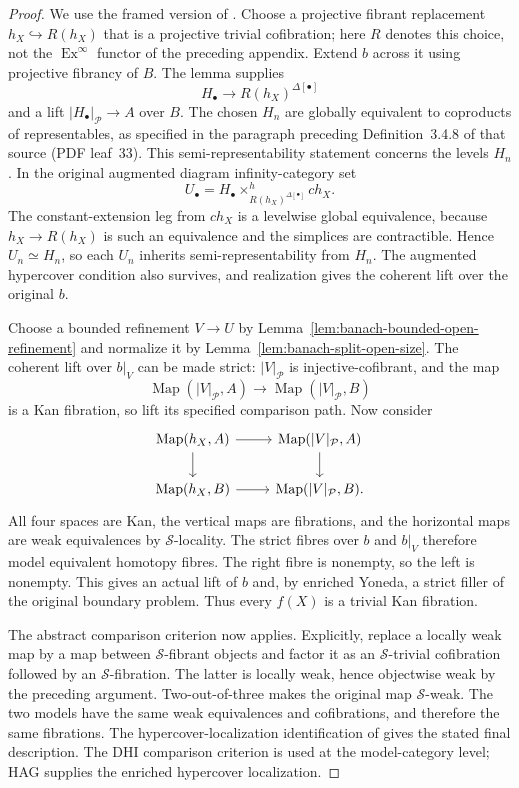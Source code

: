 \documentclass[12pt]{amsart}
\theoremstyle{definition}
\theoremstyle{remark}
\numberwithin{equation}{section}
\DeclareMathOperator{\Map}{Map}
\DeclareMathOperator{\Ex}{Ex}
\begin{document}
\begin{proof}
We use the framed version of
\cite[Lemma~3.4.3, PDF leaves~29--32]{HAGI2005}.
Choose a projective fibrant replacement
$h_X\hookrightarrow R(h_X)$ that is a projective
trivial cofibration; here $R$ denotes this choice,
not the $\Ex^\infty$ functor of the preceding appendix.
Extend $b$ across it using projective fibrancy of $B$.
The lemma supplies
\[
 H_\bullet\longrightarrow R(h_X)^{\Delta[\bullet]}
\]
and a lift $|H_\bullet|_{\mathcal P}\to A$ over $B$.
The chosen $H_n$ are globally equivalent to
coproducts of representables, as specified in the
paragraph preceding Definition~3.4.8 of that source
(PDF leaf~33). This semi-representability statement
concerns the levels $H_n$. In the original augmented
diagram infinity-category set
\[
 U_\bullet=
 H_\bullet\times^h_{R(h_X)^{\Delta[\bullet]}}c h_X.
\]
The constant-extension leg from $c h_X$ is a
levelwise global equivalence, because
$h_X\to R(h_X)$ is such an equivalence and the
simplices are contractible. Hence $U_n\simeq H_n$,
so each $U_n$ inherits semi-representability from
$H_n$. The augmented hypercover condition also
survives, and realization gives the coherent
lift over the original $b$.

Choose a bounded refinement $V\to U$ by
Lemma~\ref{lem:banach-bounded-open-refinement}
and normalize it by
Lemma~\ref{lem:banach-split-open-size}.
The coherent lift over $b|_V$ can be made strict:
$|V|_{\mathcal P}$ is injective-cofibrant, and
the map
\[
 \Map(|V|_{\mathcal P},A)\longrightarrow
 \Map(|V|_{\mathcal P},B)
\]
is a Kan fibration,
so lift its specified comparison path.
Now consider
\[
 \begin{tikzcd}
 \Map(h_X,A)\arrow[r]\arrow[d]
   &\Map(|V|_{\mathcal P},A)\arrow[d]\\
 \Map(h_X,B)\arrow[r]
   &\Map(|V|_{\mathcal P},B).
 \end{tikzcd}
\]
All four spaces are Kan, the vertical maps are
fibrations, and the horizontal maps are weak
equivalences by $\mathscr S$-locality. The strict
fibres over $b$ and $b|_V$ therefore model
equivalent homotopy fibres. The right fibre is
nonempty, so the left is nonempty. This gives
an actual lift of $b$ and, by enriched Yoneda,
a strict filler of the original boundary problem.
Thus every $f(X)$ is a trivial Kan fibration.

The abstract comparison criterion
\cite[Lemma~6.3, preprint pp.~16--17]{DHI2004}
now applies. Explicitly, replace a locally weak
map by a map between $\mathscr S$-fibrant objects
and factor it as an $\mathscr S$-trivial
cofibration followed by an $\mathscr S$-fibration.
The latter is locally weak, hence objectwise
weak by the preceding argument. Two-out-of-three
makes the original map $\mathscr S$-weak.
The two models have the same weak equivalences
and cofibrations, and therefore the same fibrations.
The hypercover-localization identification of
\cite[Theorem~3.4.1, Corollaries~3.4.5 and~3.4.7,
and Proposition~3.6.1]{HAGI2005} gives the stated
final description. The DHI comparison criterion
is used at the model-category level; HAG supplies
the enriched hypercover localization.
\end{proof}
\end{document}
